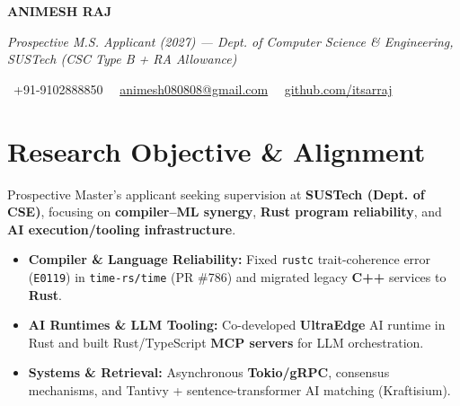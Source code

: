 \documentclass[a4paper,11pt]{article}
\newcommand{\socialicon}[1]{\raisebox{-0.05em}{\resizebox{!}{1em}{#1}}}
\newcommand{\headerfontiii}{\fontfamily{ppl}\selectfont} %
\begin{document}
\headerfontiii

\begin{center}
    {\Huge\textbf{ANIMESH RAJ}}
\end{center}
\vspace{-6mm}

\begin{center}
    {\small\textit{Prospective M.S. Applicant (2027) --- Dept. of Computer Science \& Engineering, SUSTech (CSC Type B + RA Allowance)}}
\end{center}
\vspace{-6mm}

\begin{center}
    {\small
    \socialicon{\faPhone}\ +91-9102888850 \textbar\ 
    \socialicon{\faEnvelope}\ \href{mailto:animesh080808@gmail.com}{animesh080808@gmail.com} \textbar\ 
    \socialicon{\faGithub}\ \href{https://github.com/itsarraj}{github.com/itsarraj}
    }
\end{center}
\vspace{-4mm}

\section{\textbf{Research Objective \& Alignment}}
\vspace{1mm}
{\small
Prospective Master's applicant seeking supervision at \textbf{SUSTech (Dept. of CSE)}, focusing on \textbf{compiler–ML synergy}, \textbf{Rust program reliability}, and \textbf{AI execution/tooling infrastructure}.
\begin{itemize}[leftmargin=3ex, itemsep=0.4mm, topsep=1mm]
    \item \textbf{Compiler \& Language Reliability:} Fixed \texttt{rustc} trait-coherence error (\texttt{E0119}) in \texttt{time-rs/time} (PR \#786) and migrated legacy \textbf{C++} services to \textbf{Rust}.
    \item \textbf{AI Runtimes \& LLM Tooling:} Co-developed \textbf{UltraEdge} AI runtime in Rust and built Rust/TypeScript \textbf{MCP servers} for LLM orchestration.
    \item \textbf{Systems \& Retrieval:} Asynchronous \textbf{Tokio/gRPC}, consensus mechanisms, and Tantivy + sentence-transformer AI matching (Kraftisium).
\end{itemize}
}
\vspace{-3mm}
\end{document}
